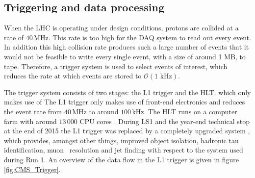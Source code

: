 
\subsection{Triggering and data processing}
\label{sec:CMSLHC_CMS_trigger}
When the \ac{LHC} is operating under design conditions, protons are collided at a rate
of $40\,$MHz. This rate is too high for the \ac{DAQ} system to read out every event. In
addition this high collision rate produces such a large number of events that it would
not be feasible to write every single event, with a size of around 1 MB, to tape. Therefore, a trigger
system is used to select events of interest, which reduces the rate
at which events are stored to  $\mathcal{O}(1 \text{ kHz})$.

The trigger system consists of two stages: the \ac{L1} trigger and the \ac{HLT}. which only makes use of
The \ac{L1} trigger only makes use of front-end electronics and reduces the event rate 
from $40\,$MHz to around $100\,$kHz. The \ac{HLT} 
runs on a computer farm with around $13\,000$ CPU cores \cite{cms-trigger}.
During \ac{LS1} and the year-end technical stop at the end of 2015 the \ac{L1} trigger was
replaced by a completely upgraded system \cite{cms-trigger-tdr}, which provides, amongst other 
things, improved object isolation, hadronic tau identification, muon \pT~resolution and
jet finding with respect to the system used during Run 1.
An overview of the data flow in the \ac{L1} trigger is given in figure \ref{fig:CMS_Trigger}.

